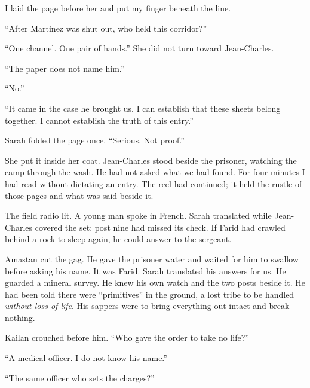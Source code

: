 I laid the page before her and put my finger beneath the line.\par

``After Martinez was shut out, who held this corridor?''\par

``One channel. One pair of hands.'' She did not turn toward Jean-Charles.\par

``The paper does not name him.''\par

``No.''\par

``It came in the case he brought us. I can establish that these sheets belong together. I cannot establish the truth of this entry.''\par

Sarah folded the page once. ``Serious. Not proof.''\par

She put it inside her coat. Jean-Charles stood beside the prisoner, watching the camp through the wash. He had not asked what we had found. For four minutes I had read without dictating an entry. The reel had continued; it held the rustle of those pages and what was said beside it.\par

The field radio lit. A young man spoke in French. Sarah translated while Jean-Charles covered the set: post nine had missed its check. If Farid had crawled behind a rock to sleep again, he could answer to the sergeant.\par

Amastan cut the gag. He gave the prisoner water and waited for him to swallow before asking his name. It was Farid. Sarah translated his answers for us. He guarded a mineral survey. He knew his own watch and the two posts beside it. He had been told there were ``primitives'' in the ground, a lost tribe to be handled \emph{without loss of life}. His sappers were to bring everything out intact and break nothing.\par

Kailan crouched before him. ``Who gave the order to take no life?''\par

``A medical officer. I do not know his name.''\par

``The same officer who sets the charges?''\par

